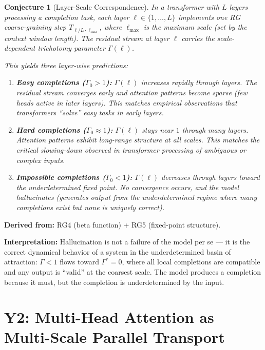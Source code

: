 \documentclass[11pt,letterpaper]{article}
\newtheorem{conjecture}{Conjecture}[section]
\begin{document}
\begin{conjecture}[Layer-Scale 
Correspondence]\label{conj:layers_rg}
In a transformer with $L$ layers processing a completion task, 
each layer $\ell \in \{1, \ldots, L\}$ implements one RG 
coarse-graining step $T_{\ell/L \cdot \ell_{\max}}$, where 
$\ell_{\max}$ is the maximum scale (set by the context window 
length). The residual stream at layer $\ell$ carries the 
scale-dependent trichotomy parameter $\Gamma(\ell)$.

This yields three layer-wise predictions:
\begin{enumerate}[label=(\alph*)]
    \item \textbf{Easy completions ($\Gamma_0 > 1$):} 
    $\Gamma(\ell)$ increases rapidly through layers. The residual 
    stream converges early and attention patterns become sparse 
    (few heads active in later layers). This matches empirical 
    observations that transformers ``solve'' easy tasks in early 
    layers.
    
    \item \textbf{Hard completions ($\Gamma_0 \approx 1$):} 
    $\Gamma(\ell)$ stays near $1$ through many layers. Attention 
    patterns exhibit long-range structure at all scales. This 
    matches the critical slowing-down observed in transformer 
    processing of ambiguous or complex inputs.
    
    \item \textbf{Impossible completions ($\Gamma_0 < 1$):} 
    $\Gamma(\ell)$ decreases through layers toward the 
    underdetermined fixed point. No convergence occurs, and the 
    model hallucinates (generates output from the underdetermined 
    regime where many completions exist but none is uniquely 
    correct).
\end{enumerate}
\end{conjecture}

\textbf{Derived from:} RG4 (beta function) + RG5 (fixed-point 
structure).

\textbf{Interpretation:} Hallucination is not a failure of the 
model per se --- it is the correct dynamical behavior of a system 
in the underdetermined basin of attraction: $\Gamma < 1$ flows 
toward $\Gamma^* = 0$, where all local completions are compatible 
and any output is ``valid'' at the coarsest scale. The model 
produces a completion because it must, but the completion is 
underdetermined by the input.

\section{Y2: Multi-Head Attention as Multi-Scale Parallel Transport}
\end{document}
